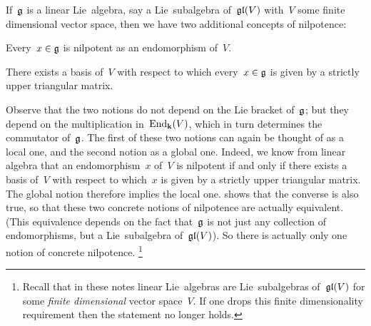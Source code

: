 \begin{remark}
  If~$\mathfrak{g}$ is a linear Lie~algebra, say a Lie~subalgebra of~$\mathfrak{gl}(V)$ with~$V$ some finite dimensional vector space, then we have two additional concepts of nilpotence:
  \begin{equivalenceslist}[label=N\arabic*), start=3]
    \item
      Every~$x \in \mathfrak{g}$ is nilpotent as an endomorphism of~$V$.
    \item
      There exists a basis of~$V$ with respect to which every~$x \in \mathfrak{g}$ is given by a strictly upper triangular matrix.
  \end{equivalenceslist}
  Observe that the two notions do not depend on the Lie bracket of~$\mathfrak{g}$;
  but they depend on the multiplication in~$\operatorname{End}_{\mathbf{k}}(V)$, which in turn determines the commutator of~$\mathfrak{g}$.
  The first of these two notions can again be thought of as a local one, and the second notion as a global one.
  Indeed, we know from linear algebra that an endomorphism~$x$ of~$V$ is nilpotent if and only if there exists a basis of~$V$ with respect to which~$x$ is given by a strictly upper triangular matrix.
  The global notion therefore implies the local one.
   shows that the converse is also true, so that these two concrete notions of nilpotence are actually equivalent.
  (This equivalence depends on the fact that~$\mathfrak{g}$ is not just any collection of endomorphisms, but a Lie~subalgebra of~$\mathfrak{gl}(V)$).
  So there is actually only one notion of concrete nilpotence.%
  \footnote{Recall that in these notes linear Lie~algebras are Lie~subalgebras of~$\mathfrak{gl}(V)$ for some \emph{finite dimensional} vector space~$V$.
  If one drops this finite dimensionality requirement then the statement no longer holds.}
  

\end{remark}
